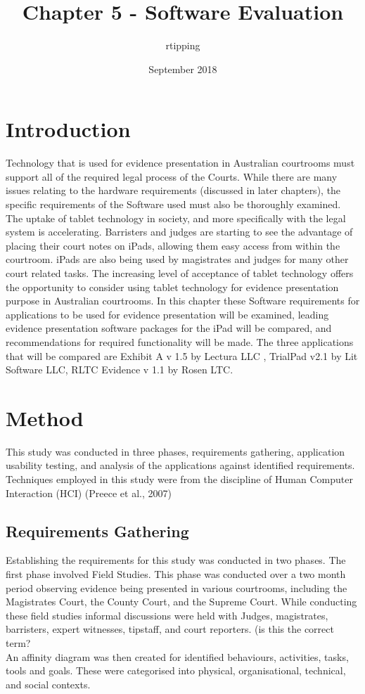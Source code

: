 \documentclass{article}
\title{Chapter 5 - Software Evaluation}
\author{rtipping }
\date{September 2018}
\begin{document}
\maketitle
\tableofcontents
\section{Introduction}
\doublespace
Technology that is used for evidence presentation in Australian courtrooms must support all of the required legal process of the Courts. While there are many issues relating to the hardware requirements (discussed in later chapters), the specific requirements of the Software used must also be thoroughly examined. The uptake of tablet technology in society, and more specifically with the legal system is accelerating. Barristers and judges are starting to see the advantage of placing their court notes on iPads, allowing them easy access from within the courtroom. iPads are also being used by magistrates and judges for many other court related tasks. The increasing level of acceptance of tablet technology offers the opportunity to consider using tablet technology for evidence presentation purpose in Australian courtrooms.
In this chapter these Software requirements for applications to be used for evidence presentation will be examined, leading evidence presentation software packages for the iPad will be compared, and recommendations for required functionality will be made.
The three applications that will be compared are Exhibit A v 1.5 by Lectura LLC ,  TrialPad v2.1 by Lit Software LLC, RLTC Evidence v 1.1 by Rosen LTC.


\section{Method}
This study was conducted in three phases, requirements gathering, application usability testing, and analysis of the applications against identified requirements. Techniques employed in this study were from the discipline of Human Computer Interaction (HCI) \color{green}(Preece et al., 2007)
\color{black}
\subsection{Requirements Gathering}
Establishing the requirements for this study was conducted in two phases. The first phase involved Field Studies. This phase was conducted over a two month period observing evidence being presented in various courtrooms, including the Magistrates Court, the County Court, and the Supreme Court. While conducting these field studies informal discussions were held with Judges, magistrates, barristers, expert witnesses, tipstaff, and court reporters. \color{green}(is this the correct term?\color{black}\\
An affinity diagram was then created for identified behaviours, activities, tasks, tools and goals. These were categorised into physical, organisational, technical, and social contexts.
\end{document}
